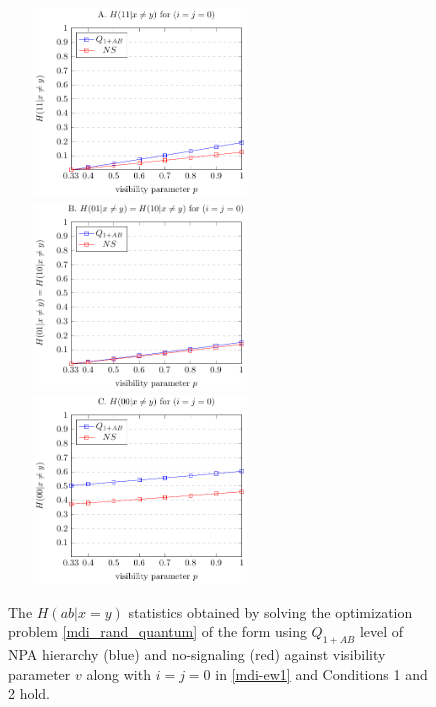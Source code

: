\documentclass[doublecol,linenumbers]{epl2} %
\begin{document}
\begin{figure}[t]
\centering
\includegraphics[height=5cm,width=7cm]{xny1.pdf}
\includegraphics[height=5cm,width=7cm]{xny2.pdf}
\includegraphics[height=5cm,width=7cm]{xny3.pdf}

\caption{The $H(ab|x=y)$ statistics obtained by solving the optimization problem \ref{mdi_rand_quantum} of the form using $Q_{1+AB}$ level of NPA hierarchy (blue) and no-signaling (red) against visibility parameter $v$ along with $i=j=0$ in \ref{mdi-ew1} and Conditions 1 and 2 hold.}\label{plot3}
\end{figure}
\end{document}
